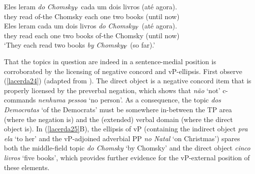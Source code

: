 \documentclass[output=paper]{langscibook}
\begin{document}
\begin{exe}
\begin{xlist}
 \label{lacerda23B1}
\gll *Eles 	leram 	\emph{do} 	\emph{Chomsky}$_{\textnormal{F}}$ 	cada 	um 	dois 	livros 	(até 	agora).\\
they 	read 	of-the 	Chomsky 	each 	one 	two 	books 	(until 	now)\\

 \label{lacerda23B2}
\gll Eles 	leram 	cada 	um 	dois 	livros 	\emph{do} 	\emph{Chomsky}$_{\textnormal{F}}$ 	(até 	agora).\\
they 	read 	each 	one 	two 	books 	of-the 	Chomsky 	(until 	now)\\
\glt‘They each read two books \emph{by Chomsky$_{\textnormal{F}}$} (so far).’
\end{xlist}

\end{exe}

That the topics in question are indeed in a sentence-medial position is corroborated by the licensing of negative concord and vP-ellipsis. First observe (\ref{lacerda24}) (adapted from \citealt[258]{Lacerda2016b}). The direct object is a negative concord item that is properly licensed by the preverbal negation, which shows that \emph{não} ‘not’ c-commands \emph{nenhuma pessoa} ‘no person’. As a consequence, the topic \emph{dos Democratas} ‘of the Democrats’ must be somewhere in-between the TP area (where the negation is) and the (extended) verbal domain (where the direct object is). In (\ref{lacerda25}B), the ellipsis of vP (containing the indirect object \emph{pra ela} ‘to her’ and the vP-adjoined adverbial PP \emph{no Natal} ‘on Christmas’) spares both the middle-field topic \emph{do Chomsky} ‘by Chomsky’ and the direct object \emph{cinco livros} ‘five books’, which provides further evidence for the vP-external position of these elements. 
\end{document}
